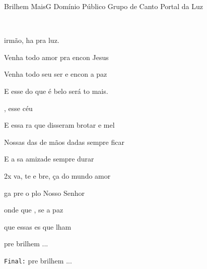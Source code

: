 \documentclass[a4,12pt,oneside]{book}
\newcommand{\RevDate}{\today}
\newcommand{\NotCCLIed}{\relax}
\renewcommand{\SBPubDom}{Domínio Público}
\begin{document}
\begin{song}{Brilhem Mais}{G}
  {\SBPubDom}
  {Grupo de Canto Portal da Luz}
  {}
  {\NotCCLIed}

	\renewcommand{\RevDate}{24 de julho de 2014}
  
  
	\ifChordBk	
		{\vspace{-2em}\flushright{\Gchord \quad \Dchord \quad \Emchord \quad \Bmchord \quad \Cchord}\\}
	\fi

	\begin{SBVerse*}
		 irmão, ha pra luz.
		
		Venha  todo amor pra encon Jesus
		
		Venha  todo seu ser e encon a paz 
		
		E esse do que é belo será to mais.
		
		,  esse céu
		
		E essa ra que disseram brotar  e mel
		
		Nossas das de mãos dadas sempre  ficar
		
		E a sa amizade sempre  durar
	\end{SBVerse*}
  
	\begin{SBChorus}
		\begin{SBBracket}{2x}
			va, te e bre, ça do mundo amor
			
			ga pre o plo  Nosso Senhor
			
			 onde  que , se a paz
			
			  que essas es que lham 
			
			pre brilhem  ...
		\end{SBBracket}

		{\small\texttt{Final:}} pre brilhem  ...
	\end{SBChorus}
\end{song}
\end{document}
